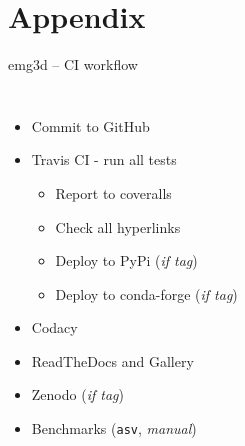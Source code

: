 \documentclass[xcolor=svgnames, aspectratio=169]{beamer}
\begin{document}
  \appendix %

  \section{Appendix} %

  \maketitle %

  \begin{frame}[t]%
    {emg3d -- CI workflow}
    \begin{columns}[t]
      \begin{itemize}
        \item Commit to GitHub
        \item Travis CI - run all tests
          \begin{itemize}
            \item Report to coveralls
            \item Check all hyperlinks
            \item Deploy to PyPi (\emph{if tag})
            \item Deploy to conda-forge (\emph{if tag})
          \end{itemize}
        \item Codacy
        \item ReadTheDocs and Gallery
        \item Zenodo (\emph{if tag})
        \item Benchmarks (\texttt{asv}, \emph{manual})
      \end{itemize}
        \vspace{.5cm}

\end{columns}
\end{frame}
\end{document}
